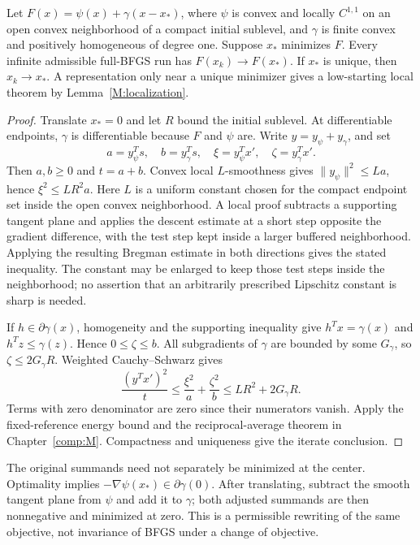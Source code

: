 \begin{theorem}\label{F:centered}
Let $F(x)=\psi(x)+\gamma(x-x_*)$, where $\psi$ is convex and locally $C^{1,1}$ on an open convex neighborhood of a compact initial sublevel, and $\gamma$ is finite convex and positively homogeneous of degree one. Suppose $x_*$ minimizes $F$. Every infinite admissible full-BFGS run has $F(x_k)\to F(x_*)$. If $x_*$ is unique, then $x_k\to x_*$. A representation only near a unique minimizer gives a low-starting local theorem by Lemma~\ref{M:localization}.
\end{theorem}
\begin{proof}
Translate $x_*=0$ and let $R$ bound the initial sublevel. At differentiable endpoints, $\gamma$ is differentiable because $F$ and $\psi$ are. Write $y=y_\psi+y_\gamma$, and set
\[
 a=y_\psi^Ts,\quad b=y_\gamma^Ts,\quad
 \xi=y_\psi^Tx',\quad\zeta=y_\gamma^Tx'.
\]
Then $a,b\ge0$ and $t=a+b$. Convex local $L$-smoothness gives $\|y_\psi\|^2\le La$, hence $\xi^2\le LR^2a$. Here $L$ is a uniform constant chosen for the compact endpoint set inside the open convex neighborhood. A local proof subtracts a supporting tangent plane and applies the descent estimate at a short step opposite the gradient difference, with the test step kept inside a larger buffered neighborhood. Applying the resulting Bregman estimate in both directions gives the stated inequality. The constant may be enlarged to keep those test steps inside the neighborhood; no assertion that an arbitrarily prescribed Lipschitz constant is sharp is needed.

If $h\in\partial\gamma(x)$, homogeneity and the supporting inequality give $h^Tx=\gamma(x)$ and $h^Tz\le\gamma(z)$. Hence $0\le\zeta\le b$. All subgradients of $\gamma$ are bounded by some $G_\gamma$, so $\zeta\le2G_\gamma R$. Weighted Cauchy--Schwarz gives
\[
 \frac{(y^Tx')^2}{t}
 \le\frac{\xi^2}{a}+\frac{\zeta^2}{b}
 \le LR^2+2G_\gamma R.
\]
Terms with zero denominator are zero since their numerators vanish. Apply the fixed-reference energy bound and the reciprocal-average theorem in Chapter~\ref{comp:M}. Compactness and uniqueness give the iterate conclusion.
\end{proof}
The original summands need not separately be minimized at the center. Optimality implies $-\nabla\psi(x_*)\in\partial\gamma(0)$. After translating, subtract the smooth tangent plane from $\psi$ and add it to $\gamma$; both adjusted summands are then nonnegative and minimized at zero. This is a permissible rewriting of the same objective, not invariance of BFGS under a change of objective.

